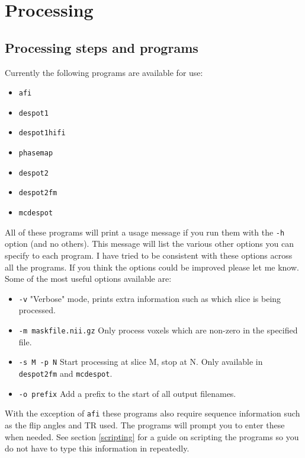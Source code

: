 \documentclass{report}
\begin{document}
\chapter{Processing}

\section{Processing steps and programs}

Currently the following programs are available for use:
\begin{itemize} \itemsep1pt \parskip0pt 
  \item \texttt{afi}
  \item \texttt{despot1}
  \item \texttt{despot1hifi}
  \item \texttt{phasemap}
  \item \texttt{despot2}
  \item \texttt{despot2fm}
  \item \texttt{mcdespot}
\end{itemize}

All of these programs will print a usage message if you run them with the \texttt{-h} option (and no others). This message will list the various other options you can specify to each program. I have tried to be consistent with these options across all the programs. If you think the options could be improved please let me know. Some of the most useful options available are:

\begin{itemize} \itemsep1pt \parskip0pt 
	\item \texttt{-v} "Verbose" mode, prints extra information such as which slice is being processed.
	\item \texttt{-m maskfile.nii.gz} Only process voxels which are non-zero in the specified file.
	\item \texttt{-s M -p N} Start processing at slice M, stop at N. Only available in \texttt{despot2fm} and \texttt{mcdespot}.
	\item \texttt{-o prefix} Add a prefix to the start of all output filenames.
\end{itemize}

With the exception of \texttt{afi} these programs also require sequence information such as the flip angles and TR used. The programs will prompt you to enter these when needed. See section \ref{scripting} for a guide on scripting the programs so you do not have to type this information in repeatedly.
\end{document}
